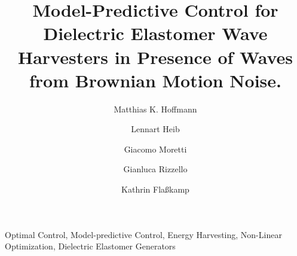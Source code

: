 \documentclass{ifacconf}
\begin{document}
	\begin{frontmatter}
		
		\title{Model-Predictive Control for Dielectric Elastomer Wave Harvesters in Presence of Waves from Brownian Motion Noise.} 
		
		\author[First]{Matthias K. Hoffmann} 
		\author[First]{Lennart Heib} 
		\author[Second]{Giacomo Moretti}
		\author[Third]{Gianluca Rizzello}
		\author[First]{Kathrin Flaßkamp} 
		
		\address[First]{Systems Modeling and Simulation,\linebreak (e-mail:~\{{matthias.hoffmann, kathrin.flasskamp\}@uni-saarland.de, lennartheib@gmail.com})}
		\address[Second]{Università degli Studi di Trento, (e-mail:~giacomo.moretti@unitn.it)}
		\address[Third]{Intelligent Material Systems Lab,\linebreak
			(e-mail:~gianluca.rizzello@imsl.uni-saarland.de)
			\linebreak
			$^{*}$ and $^{***}$ from Saarland University, Saarbrücken, Germany.}
		
		\begin{abstract}                %
			
		\end{abstract}
		
		\begin{keyword}
			Optimal Control, Model-predictive Control, Energy Harvesting, Non-Linear Optimization, Dielectric Elastomer Generators
		\end{keyword}
		
	\end{frontmatter}
	
	
	
	
	
	
	
	
	
\end{document}

